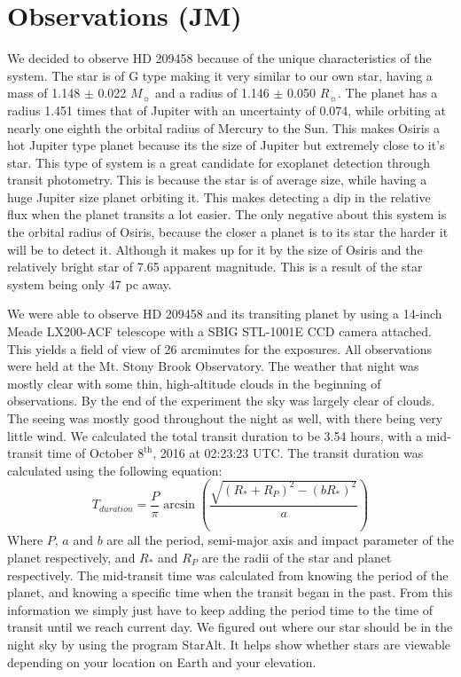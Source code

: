 \documentclass{aastex61}
\begin{document}
\section{Observations (JM)}
We decided to observe HD 209458 because of the unique characteristics of the system. The star is of G type making it very similar to our own star, having a mass of 1.148 $\pm$ 0.022 $M_\sun$ and a radius of 1.146 $\pm$ 0.050 $R_\sun$. The planet has a radius 1.451 times that of Jupiter with an uncertainty of 0.074, while orbiting at nearly one eighth the orbital radius of Mercury to the Sun. This makes Osiris a hot Jupiter type planet because its the size of Jupiter but extremely close to it's star. This type of system is a great candidate for exoplanet detection through transit photometry. This is because the star is of average size, while having a huge Jupiter size planet orbiting it. This makes detecting a dip in the relative flux when the planet transits a lot easier. The only negative about this system is the orbital radius of Osiris, because the closer a planet is to its star the harder it will be to detect it. Although it makes up for it by the size of Osiris and the relatively bright star of 7.65 apparent magnitude. This is a result of the star system being only 47 pc away.

We were able to observe HD 209458 and its transiting planet by using a 14-inch Meade LX200-ACF telescope with a SBIG STL-1001E CCD camera attached. This yields a field of view of 26 arcminutes for the exposures. All observations were held at the Mt. Stony Brook Observatory. The weather that night was mostly clear with some thin, high-altitude clouds in the beginning of observations. By the end of the experiment the sky was largely clear of clouds. The seeing was mostly good throughout the night as well, with there being very little wind. We calculated the total transit duration to be 3.54 hours, with a mid-transit time of October $8^{\text{th}}$, 2016 at 02:23:23 UTC. The transit duration was calculated using the following equation:
\begin{equation}
T_{duration} = \frac{P}{\pi}\arcsin\left(\frac{\sqrt{(R_*+R_P)^{2}-(bR_*)^{2}}}{a}\right)
\end{equation}
Where $P$, $a$ and $b$ are all the period, semi-major axis and impact parameter of the planet respectively, and $R_*$ and $R_P$ are the radii of the star and planet respectively. The mid-transit time was calculated from knowing the period of the planet, and knowing a specific time when the transit began in the past. From this information we simply just have to keep adding the period time to the time of transit until we reach current day. We figured out where our star should be in the night sky by using the program StarAlt. It helps show whether stars are viewable depending on your location on Earth and your elevation.
\end{document}
